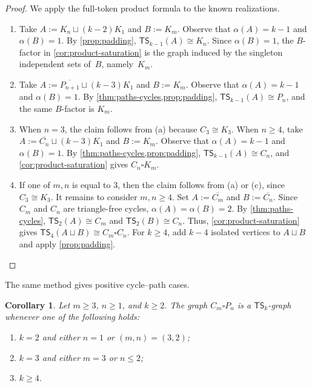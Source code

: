 \documentclass[a4paper]{article}
\theoremstyle{plain}
\newtheorem{corollary}[corollary]{Corollary}
\theoremstyle{definition}
\newcommand{\TSsym}{\mathsf{TS}}
\numberwithin{equation}{section}
\begin{document}
\begin{proof}
We apply the full-token product formula to the known realizations.
\begin{enumerate}[label=\textup{(\alph*)},leftmargin=2em]
\item Take $A:=K_n\sqcup (k-2)K_1$ and $B:=K_m$.
Observe that $\alpha(A)=k-1$ and $\alpha(B)=1$.
By \cref{prop:padding}, $\TSsym_{k-1}(A)\cong K_n$.
Since $\alpha(B)=1$, the $B$-factor in \cref{cor:product-saturation} is the graph induced by the singleton independent sets of~$B$, namely~$K_m$.

\item Take $A:=\overline{P_{n+1}}\sqcup (k-3)K_1$ and $B:=K_m$.
Observe that $\alpha(A)=k-1$ and $\alpha(B)=1$.
By \cref{thm:paths-cycles,prop:padding}, $\TSsym_{k-1}(A)\cong P_n$, and the same $B$-factor is $K_m$.

\item When $n=3$, the claim follows from \textup{(a)} because $C_3\cong K_3$.
When $n\ge 4$, take $A:=\overline{C_n}\sqcup (k-3)K_1$ and $B:=K_m$.
Observe that $\alpha(A)=k-1$ and $\alpha(B)=1$.
By \cref{thm:paths-cycles,prop:padding}, $\TSsym_{k-1}(A)\cong C_n$, and \cref{cor:product-saturation} gives $C_n\square K_m$.

\item If one of $m,n$ is equal to $3$, then the claim follows from \textup{(a)} or \textup{(c)}, since $C_3\cong K_3$.
It remains to consider $m,n\ge 4$.
Set $A:=\overline{C_m}$ and $B:=\overline{C_n}$.
Since $C_m$ and $C_n$ are triangle-free cycles, $\alpha(A)=\alpha(B)=2$.
By \cref{thm:paths-cycles}, $\TSsym_2(A)\cong C_m$ and $\TSsym_2(B)\cong C_n$.
Thus, \cref{cor:product-saturation} gives $\TSsym_4(A\sqcup B)\cong C_m\square C_n$.
For $k\ge 4$, add $k-4$ isolated vertices to $A\sqcup B$ and apply \cref{prop:padding}.
\end{enumerate}
\end{proof}

The same method gives positive cycle--path cases.

\begin{corollary}
\label{cor:cycle-path-positive}
Let $m\ge 3$, $n\ge 1$, and $k\ge 2$.
The graph $C_m\square P_n$ is a $\TSsym_k$-graph whenever one of the following holds:
\begin{enumerate}[label=\textup{(\alph*)}]
\item $k=2$ and either $n=1$ or $(m,n)=(3,2)$;
\item $k=3$ and either $m=3$ or $n\le 2$;
\item $k\ge 4$.
\end{enumerate}
\end{corollary}
\end{document}
